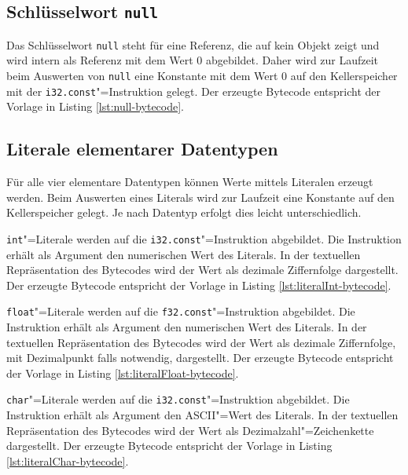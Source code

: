 \subsection{Schlüsselwort \lstinline{null}}

Das Schlüsselwort \lstinline{null} steht für eine Referenz, die auf kein Objekt zeigt und wird intern als Referenz mit dem Wert $0$ abgebildet. Daher wird zur Laufzeit beim Auswerten von \lstinline{null} eine Konstante mit dem Wert $0$ auf den Kellerspeicher mit der \lstinline{i32.const}"=Instruktion gelegt. Der erzeugte Bytecode entspricht der Vorlage in Listing \ref{lst:null-bytecode}.



\subsection{Literale elementarer Datentypen}

Für alle vier elementare Datentypen können Werte mittels Literalen erzeugt werden. Beim Auswerten eines Literals wird zur Laufzeit eine Konstante auf den Kellerspeicher gelegt. Je nach Datentyp erfolgt dies leicht unterschiedlich.

\lstinline{int}"=Literale werden auf die \lstinline{i32.const}"=Instruktion abgebildet. Die Instruktion erhält als Argument den numerischen Wert des Literals. In der textuellen Repräsentation des Bytecodes wird der Wert als dezimale Ziffernfolge dargestellt. Der erzeugte Bytecode entspricht der Vorlage in Listing \ref{lst:literalInt-bytecode}.



\lstinline{float}"=Literale werden auf die \lstinline{f32.const}"=Instruktion abgebildet. Die Instruktion erhält als Argument den numerischen Wert des Literals. In der textuellen Repräsentation des Bytecodes wird der Wert als dezimale Ziffernfolge, mit Dezimalpunkt falls notwendig, dargestellt. Der erzeugte Bytecode entspricht der Vorlage in Listing \ref{lst:literalFloat-bytecode}.



\lstinline{char}"=Literale werden auf die \lstinline{i32.const}"=Instruktion abgebildet. Die Instruktion erhält als Argument den ASCII"=Wert des Literals. In der textuellen Repräsentation des Bytecodes wird der Wert als Dezimalzahl"=Zeichenkette dargestellt. Der erzeugte Bytecode entspricht der Vorlage in Listing \ref{lst:literalChar-bytecode}.

